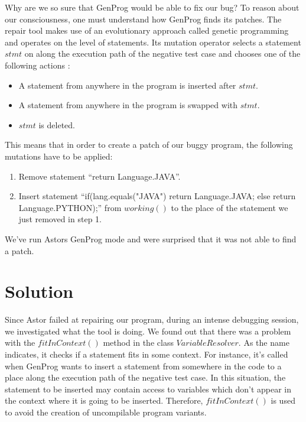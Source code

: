 \documentclass[pdftex,english,oribibl]{llncs}
\begin{document}
Why are we so sure that GenProg would be able to fix our bug?
To reason about our consciousness, one must understand how GenProg finds its patches.
The repair tool makes use of an evolutionary approach called genetic programming and operates on the level of statements. Its mutation operator selects a statement $stmt$ on along the execution path of the negative test case and chooses one of the following actions \cite{Philipp}:
\begin{itemize}
 	\item A statement from anywhere in the program is inserted after $stmt$.
 	\item A statement from anywhere in the program is swapped with $stmt$.
 	\item $stmt$ is deleted.
\end{itemize}
This means that in order to create a patch of our buggy program, the following mutations have to be applied:
\begin{enumerate}
	\item Remove statement ``return Language.JAVA''.
	\item Insert statement ``if(lang.equals("JAVA") return Language.JAVA; else return Language.PYTHON);'' from $working()$ to the place of the statement we just removed in step 1.
\end{enumerate}
We've run Astors GenProg mode and were surprised that it was not able to find a patch.

\section{Solution}\label{sec:solution}

Since Astor failed at repairing our program, during an intense debugging session, we investigated what the tool is doing.
We found out that there was a problem with the $fitInContext()$ method in the class $VariableResolver$. As the name indicates, it checks if a statement fits in some context. For instance, it's called when GenProg wants to insert a statement from somewhere in the code to a place along the execution path of the negative test case. In this situation, the statement to be inserted may contain access to variables which don't appear in the context where it is going to be inserted. Therefore, $fitInContext()$ is used to avoid the creation of uncompilable program variants.
\end{document}

